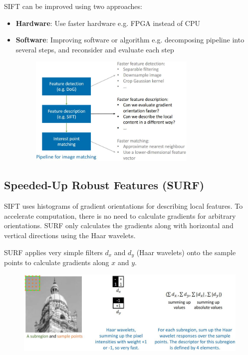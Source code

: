 \documentclass{report}
\begin{document}
SIFT can be improved using two approaches:
\begin{itemize}
    \item \textbf{Hardware}: Use faster hardware e.g. FPGA instead of CPU 
    \item \textbf{Software}: Improving software or algorithm e.g. decomposing
    pipeline into several steps, and reconsider and evaluate each step
    \begin{figure}[h]
        \centering
        \includegraphics[width=8cm]{Pipeline.JPG}
    \end{figure}
\end{itemize}

\subsection{Speeded-Up Robust Features (SURF)}

SIFT uses histograms of gradient orientations for describing local features. To
accelerate computation, there is no need to calculate gradients for arbitrary
orientations. SURF only calculates the gradients along with horizontal
and vertical directions using the Haar wavelets.

SURF applies very simple filters $d_x$ and $d_y$ (Haar wavelets) onto the
sample points to calculate gradients along $x$ and $y$.
\begin{figure}[h]
    \centering
    \includegraphics[width=12cm]{SURF.JPG}
\end{figure}

\pagebreak
\end{document}
